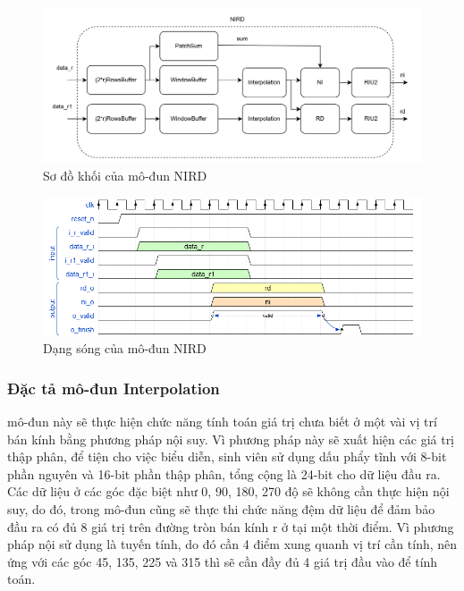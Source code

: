 \begin{figure}[!ht]
    \centering
    \includegraphics[width=\linewidth]{figures/nirdArch.png}
    \caption{Sơ đồ khối của mô-đun NIRD}
    \label{fig:nirdArch}
\end{figure}
\begin{figure}[!ht]
    \centering
    \includegraphics[width=\linewidth]{figures/nird.png}
    \caption{Dạng sóng của mô-đun NIRD}
    \label{fig:nird}
\end{figure}

\subsubsection{Đặc tả mô-đun Interpolation}
mô-đun này sẽ thực hiện chức năng tính toán giá trị chưa biết ở một vài vị trí bán kính bằng phương pháp nội suy. Vì phương pháp này sẽ xuất hiện các giá trị thập phân, để tiện cho việc biểu diễn, sinh viên sử dụng dấu phẩy tĩnh với 8-bit phần nguyên và 16-bit phần thập phân, tổng cộng là 24-bit cho dữ liệu đầu ra. Các dữ liệu ở các góc đặc biệt như 0, 90, 180, 270 độ sẽ không cần thực hiện nội suy, do đó, trong mô-đun cũng sẽ thực thi chức năng đệm dữ liệu để đảm bảo đầu ra có đủ 8 giá trị trên đường tròn bán kính r ở tại một thời điểm. Vì phương pháp nội sử dụng là tuyến tính, do đó cần 4 điểm xung quanh vị trí cần tính, nên ứng với các góc 45, 135, 225 và 315 thì sẽ cần đầy đủ 4 giá trị đầu vào để tính toán.

